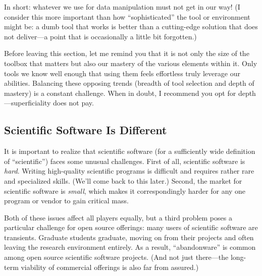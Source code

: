 In short: whatever we use for data manipulation must not get in our
way! (I consider this more important than how ``sophisticated'' the
tool or environment might be: a dumb tool that works is better than a
cutting-edge solution that does not deliver---a point that is
occasionally a little bit forgotten.)

Before leaving this section, let me remind you that it is not only the
size of the toolbox that matters but also our mastery of the various
elements within it. Only tools we know well enough that using them
feels effortless truly leverage our abilities.  Balancing these
opposing trends (breadth of tool selection and depth of mastery) is a
constant challenge. When in doubt, I recommend you opt for
depth---superficiality does not pay.

% 

\subsection{Scientific Software Is Different}

It is important to realize that scientific software (for a
sufficiently wide definition of ``scientific'') faces some unusual
challenges. First of all, scientific software is \emph{hard}. Writing
high-quality scientific programs is difficult and requires rather rare
and specialized skills. (We'll come back to this later.) Second, the
market for scientific software is \emph{small}, which makes it
correspondingly harder for any one program or vendor to gain critical
mass.

Both of these issues affect all players equally, but a third problem
poses a particular challenge for open source offerings: many users of
scientific software are transients. Graduate students graduate, moving\vadjust{\pagebreak}
on from their projects and often leaving the research environment
entirely. As a result, ``abandonware'' is common among open source
scientific software projects. (And not just there---the long-term
viability of commercial offerings is also far from assured.)

